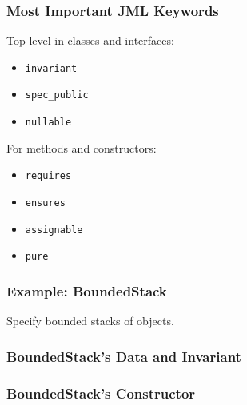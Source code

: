 \begin{frame}
\frametitle{Most Important JML Keywords}

Top-level in classes and interfaces:
\begin{itemize}
\item
\lstinline!invariant!

\item
\lstinline!spec_public!

\item
\lstinline!nullable!
\end{itemize}

For methods and constructors:
\begin{itemize}
\item
\lstinline!requires!

\item
\lstinline!ensures!

\item
\lstinline!assignable!

\item
\lstinline!pure!
\end{itemize}
\end{frame}

\begin{frame}
\frametitle{Example: BoundedStack}

\begin{example}
Specify bounded stacks of objects.
\end{example}

\end{frame}

\begin{frame}[fragile]
\frametitle{BoundedStack's Data and Invariant}

\end{frame}

\begin{frame}[fragile]
\frametitle{BoundedStack's Constructor}

\end{frame}

